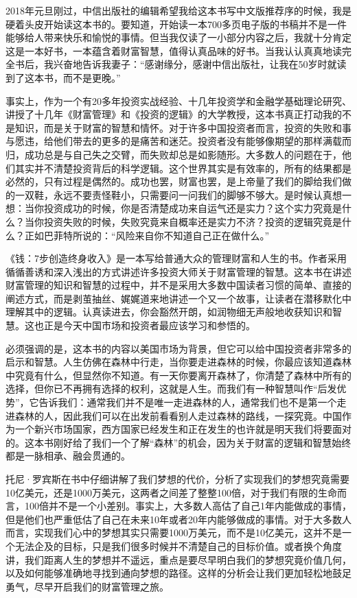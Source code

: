 

2018年元旦刚过，中信出版社的编辑希望我给这本书写中文版推荐序的时候，我是硬着头皮开始读这本书的。要知道，开始读一本700多页电子版的书稿并不是一件能够给人带来快乐和愉悦的事情。但当我仅读了一小部分内容之后，我就十分肯定这是一本好书，一本蕴含着财富智慧，值得认真品味的好书。当我认认真真地读完全书后，我兴奋地告诉我妻子：“感谢缘分，感谢中信出版社，让我在50岁时就读到了这本书，而不是更晚。”

事实上，作为一个有20多年投资实战经验、十几年投资学和金融学基础理论研究、讲授了十几年《财富管理》和《投资的逻辑》的大学教授，这本书真正打动我的不是知识，而是关于财富的智慧和情怀。对于许多中国投资者而言，投资的失败和事与愿违，给他们带去的更多的是痛苦和迷茫。投资者没有能够像期望的那样满载而归，成功总是与自己失之交臂，而失败却总是如影随形。大多数人的问题在于，他们其实并不清楚投资背后的科学逻辑。这个世界其实是有效率的，所有的结果都是必然的，只有过程是偶然的。成功也罢，财富也罢，是上帝量了我们的脚给我们做的一双鞋，永远不要责怪鞋小，只需要问一问我们的脚够不够大。是时候认真想一想：当你投资成功的时候，你是否清楚成功来自运气还是实力？这个实力究竟是什么？当你投资失败的时候，失败究竟来自概率还是实力不济？投资的逻辑究竟是什么？正如巴菲特所说的：“风险来自你不知道自己正在做什么。”

《钱：7步创造终身收入》是一本写给普通大众的管理财富和人生的书。作者采用循循善诱和深入浅出的方式讲述许多投资大师关于财富管理的智慧。这本书在讲述财富管理的知识和智慧的过程中，并不是采用大多数中国读者习惯的简单、直接的阐述方式，而是剥茧抽丝、娓娓道来地讲述一个又一个故事，让读者在潜移默化中理解其中的逻辑。认真读进去，你会豁然开朗，如润物细无声般地收获知识和智慧。这也正是今天中国市场和投资者最应该学习和参悟的。

必须强调的是，这本书的内容以美国市场为背景，但它可以给中国投资者非常多的启示和智慧。人生仿佛在森林中行走，当你要走进森林的时候，你最应该知道森林中究竟有什么，但显然你不知道。有一天你要离开森林了，你清楚了森林中所有的选择，但你已不再拥有选择的权利，这就是人生。而我们有一种智慧叫作“后发优势”，它告诉我们：通常我们并不是唯一走进森林的人，通常我们也不是第一个走进森林的人，因此我们可以在出发前看看别人走过森林的路线，一探究竟。中国作为一个新兴市场国家，西方国家已经发生和正在发生的也许就是明天我们将要面对的。这本书刚好给了我们一个了解“森林”的机会，因为关于财富的逻辑和智慧始终都是一脉相承、融会贯通的。

托尼·罗宾斯在书中仔细讲解了我们梦想的代价，分析了实现我们的梦想究竟需要10亿美元，还是1000万美元，这两者之间差了整整100倍，对于我们有限的生命而言，100倍并不是一个小差别。事实上，大多数人高估了自己1年内能做成的事情，但是他们也严重低估了自己在未来10年或者20年内能够做成的事情。对于大多数人而言，实现我们心中的梦想其实只需要1000万美元，而不是10亿美元，这并不是一个无法企及的目标，只是我们很多时候并不清楚自己的目标价值。或者换个角度讲，我们距离人生的梦想并不遥远，重点是要尽早明白我们的梦想究竟价值几何，以及如何能够准确地寻找到通向梦想的路径。这样的分析会让我们更加轻松地鼓足勇气，尽早开启我们的财富管理之旅。

